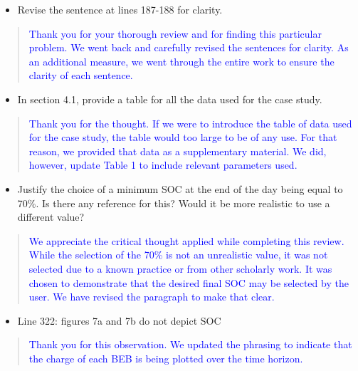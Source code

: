 \documentclass[11pt,a4paper,final]{article}
\begin{document}
\begin{itemize}
\item Revise the sentence at lines 187-188 for clarity.
\end{itemize}

\begin{quote}
  \textcolor{blue}{Thank you for your thorough review and for finding this particular problem. We went back and carefully revised the sentences for clarity. As an additional measure, we went through the entire work to ensure the clarity of each sentence.}
\end{quote}

\begin{itemize}
\item In section 4.1, provide a table for all the data used for the case study.
\end{itemize}

\begin{quote}
  \textcolor{blue}{Thank you for the thought. If we were to introduce the table of data used for the case study, the table would too large to be of any use. For that reason, we provided that data as a supplementary material. We did, however, update Table 1 to include relevant parameters used.}
\end{quote}

\begin{itemize}
\item Justify the choice of a minimum SOC at the end of the day being equal to 70\%. Is there any reference for this? Would it be more realistic to use a different value?
\end{itemize}

\begin{quote}
  \textcolor{blue}{We appreciate the critical thought applied while completing this review. While the selection of the 70\% is not an unrealistic value, it was not selected due to a known practice or from other scholarly work. It was chosen to demonstrate that the desired final SOC may be selected by the user. We have revised the paragraph to make that clear.}
\end{quote}

\begin{itemize}
\item Line 322: figures 7a and 7b do not depict SOC
\end{itemize}

\begin{quote}
  \textcolor{blue}{Thank you for this observation. We updated the phrasing to indicate that the charge of each BEB is being plotted over the time horizon.}
\end{quote}
\end{document}
